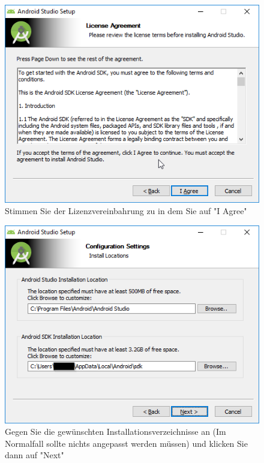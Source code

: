 \documentclass[a4paper,10pt,xetex]{article}
\begin{document}
\begin{figure}
  \centering
  \includegraphics[width=\textwidth]{Installation/1-3}
  \caption{Stimmen Sie der Lizenzvereinbahrung zu in dem Sie auf "I Agree" }
\end{figure}

\begin{figure}
  \centering
  \includegraphics[width=\textwidth]{Installation/1-4}
  \caption{Gegen Sie die gewünschten Installationsverzeichnisse an (Im Normalfall sollte nichts angepasst werden müssen) und klicken Sie dann auf "Next" }
\end{figure}
\end{document}

